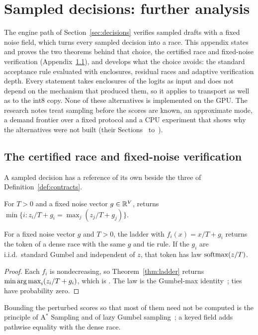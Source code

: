 \section{Sampled decisions: further analysis}\label{app:sampling}
The engine path of Section~\ref{sec:decisions} verifies sampled drafts with a fixed noise field, which turns every sampled decision into a race. This appendix states and proves the two theorems behind that choice, the certified race and fixed-noise verification (Appendix~\ref{app:fixednoise}), and develops what the choice avoids: the standard acceptance rule evaluated with enclosures, residual races and adaptive verification depth. Every statement takes enclosures of the logits as input and does not depend on the mechanism that produced them, so it applies to transport as well as to the int8 copy. None of these alternatives is implemented on the GPU. The research notes treat sampling before the scores are known, an approximate mode, a demand frontier over a fixed protocol and a CPU experiment that shows why the alternatives were not built (their Sections~ to~).

\subsection{The certified race and fixed-noise verification}\label{app:fixednoise}
A sampled decision has a reference of its own beside the three of Definition~\ref{def:contracts}.
\begin{definition}\label{def:srace}
For $T>0$ and a fixed noise vector $g\in\mathbb R^V$, \Srace{} returns $\min\{i:z_i/T+g_i=\max_j(z_j/T+g_j)\}$.
\end{definition}

\begin{theorem}\label{thm:race}
For a fixed noise vector $g$ and $T>0$, the ladder with $f_i(x)=x/T+g_i$ returns the token of a dense race with the same $g$ and tie rule. If the $g_i$ are i.i.d.\ standard Gumbel and independent of $z$, that token has law $\operatorname{softmax}(z/T)$.
\end{theorem}
\begin{proof}
Each $f_i$ is nondecreasing, so Theorem~\ref{thm:ladder} returns $\min\operatorname*{arg\,max}_i(z_i/T+g_i)$, which is \Srace. The law is the Gumbel-max identity~\cite{papandreou2011,astar}; ties have probability zero.
\end{proof}
Bounding the perturbed scores so that most of them need not be computed is the principle of A$^\ast$ Sampling and of lazy Gumbel sampling~\cite{astar,mussmann2017}; a keyed field adds pathwise equality with the dense race.

